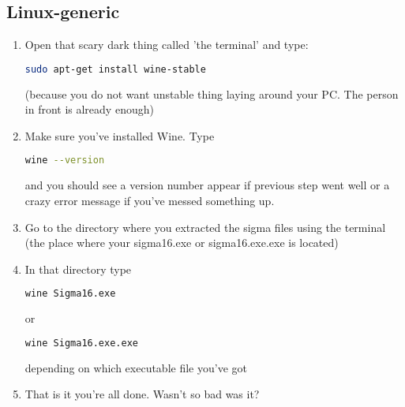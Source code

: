 \documentclass[11pt,a4paper]{article}
\begin{document}
 \subsection{Linux-generic}
 \begin{enumerate}
      
 
   \item Open that scary dark thing called 'the terminal' and type: 
\begin{lstlisting}[language=Bash]
sudo apt-get install wine-stable
\end{lstlisting}
    (because you do not want unstable thing laying around your PC. The person in front is already enough)
   \item Make sure you've installed Wine. Type
\begin{lstlisting}[language=Bash]
wine --version
\end{lstlisting}
and you should see a version number appear if previous step went well or a crazy error message if you've messed something up.
   \item Go to the directory where you extracted the sigma files using the terminal (the place where your sigma16.exe or sigma16.exe.exe is located)
   \item In that directory type
\begin{lstlisting}[language=Bash]
wine Sigma16.exe
\end{lstlisting}
    or 
\begin{lstlisting}[language=Bash]
wine Sigma16.exe.exe
\end{lstlisting}
depending on which executable file you've got
   \item That is it you're all done. Wasn't so bad was it?
\end{enumerate}
\end{document}
